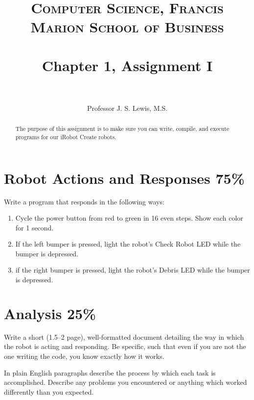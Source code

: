 \documentclass[paper=a4, fontsize=11pt]{scrartcl} %
\title{
\fontfamily{lmss}\selectfont \normalsize 
\textsc{Computer Science, Francis Marion School of Business} \\ [25pt]
\horrule{1.5pt} \\[0.4cm] %
\huge Chapter 1, Assignment I \\ %
\horrule{2pt} \\[0.5cm] %
}
\author{\small Professor J. S. Lewis, M.S.} %
\date{}
\numberwithin{equation}{section}
\numberwithin{figure}{section}
\numberwithin{table}{section}
\begin{document}
\selectfont

\maketitle %

\begin{abstract}
The purpose of this assignment is to make sure you can write, compile, and
execute programs for our iRobot Create robots.
\end{abstract}

\section{Robot Actions and Responses 75\%}

Write a program that responds in the following ways:
\begin{enumerate}
  \item Cycle the power button from red to green in 16 even steps. Show each
  color for 1 second.
  \item If the left bumper is pressed, light the robot's Check Robot LED while
  the bumper is depressed.
  \item if the right bumper is pressed, light the robot's Debris LED while the
  bumper is depressed.
\end{enumerate}

\section{Analysis 25\%}
%
Write a short (1.5--2 page), well-formatted document detailing the way in which
the robot is acting and responding. Be specific, such that even if you are not
the one writing the code, you know exactly how it works.

In plain English paragraphs describe the process by which each task is
accomplished. Describe any problems you encountered or anything which worked
differently than you expected.
\end{document}

